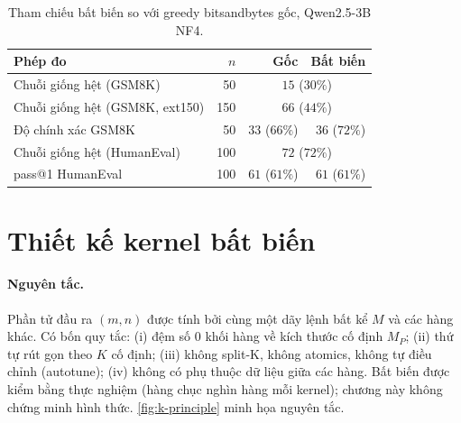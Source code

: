 \begin{table}[t]
\centering\small
\caption{Tham chiếu bất biến so với greedy bitsandbytes gốc, Qwen2.5-3B NF4.}\label{tab:k-ref}
\begin{tabular}{@{}lrrr@{}}
\toprule
Phép đo & $n$ & Gốc & Bất biến\\\midrule
Chuỗi giống hệt (GSM8K) & 50 & \multicolumn{2}{c}{$15$ ($30\%$)}\\
Chuỗi giống hệt (GSM8K, ext150) & 150 & \multicolumn{2}{c}{$66$ ($44\%$)}\\
Độ chính xác GSM8K & 50 & $33$ ($66\%$) & $36$ ($72\%$)\\
Chuỗi giống hệt (HumanEval) & 100 & \multicolumn{2}{c}{$72$ ($72\%$)}\\
pass@1 HumanEval & 100 & $61$ ($61\%$) & $61$ ($61\%$)\\
\bottomrule
\end{tabular}
\end{table}

\section{Thiết kế kernel bất biến}\label{sec:k-design}
\paragraph{Nguyên tắc.} Phần tử đầu ra $(m,n)$ được tính bởi cùng một dãy lệnh bất kể $M$ và các hàng khác. Có bốn quy tắc: (i) đệm số 0 khối hàng về kích thước cố định $M_P$; (ii) thứ tự rút gọn theo $K$ cố định; (iii) không split-K, không atomics, không tự điều chỉnh (autotune); (iv) không có phụ thuộc dữ liệu giữa các hàng. Bất biến được kiểm bằng thực nghiệm (hàng chục nghìn hàng mỗi kernel); chương này không chứng minh hình thức. \cref{fig:k-principle} minh họa nguyên tắc.


